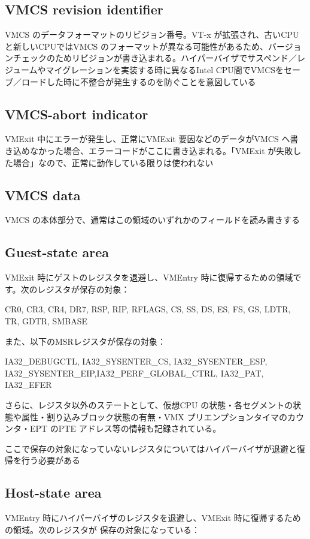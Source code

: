 \subsection*{VMCS revision identifier}
VMCS のデータフォーマットのリビジョン番号。VT-x が拡張され、古いCPUと新しいCPUではVMCS のフォーマットが異なる可能性があるため、バージョンチェックのためリビジョンが書き込まれる。ハイパーバイザでサスペンド／レジュームやマイグレーションを実装する時に異なるIntel CPU間でVMCSをセーブ／ロードした時に不整合が発生するのを防ぐことを意図している

\subsection*{VMCS-abort indicator}
VMExit 中にエラーが発生し、正常にVMExit 要因などのデータがVMCS へ書き込めなかった場合、エラーコードがここに書き込まれる。「VMExit が失敗した場合」なので、正常に動作している限りは使われない

\subsection*{VMCS data}
VMCS の本体部分で、通常はこの領域のいずれかのフィールドを読み書きする

\subsection*{Guest-state area}
VMExit 時にゲストのレジスタを退避し、VMEntry 時に復帰するための領域です。次のレジスタが保存の対象：

CR0, CR3, CR4, DR7, RSP, RIP, RFLAGS, CS, SS, DS, ES, FS, GS, LDTR, TR, GDTR, SMBASE

また、以下のMSRレジスタが保存の対象：

IA32\_DEBUGCTL, IA32\_SYSENTER\_CS, IA32\_SYSENTER\_ESP, IA32\_SYSENTER\_EIP,IA32\_PERF\_GLOBAL\_CTRL, IA32\_PAT, IA32\_EFER

さらに、レジスタ以外のステートとして、仮想CPU の状態・各セグメントの状態や属性・割り込みブロック状態の有無・VMX プリエンプションタイマのカウンタ・EPT のPTE アドレス等の情報も記録されている。

ここで保存の対象になっていないレジスタについてはハイパーバイザが退避と復帰を行う必要がある

\subsection*{Host-state area}
VMEntry 時にハイパーバイザのレジスタを退避し、VMExit 時に復帰するための領域。次のレジスタが
保存の対象になっている：

